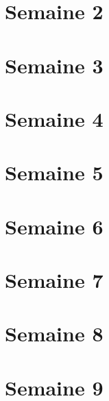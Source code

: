 \documentclass[11pt,fleqn]{book}
\begin{document}
								\chapter{Semaine 2}
								\chapter{Semaine 3}
								\chapter{Semaine 4}
								\chapter{Semaine 5}
								\chapter{Semaine 6}
								\chapter{Semaine 7}
								\chapter{Semaine 8}
								\chapter{Semaine 9}
\end{document}
